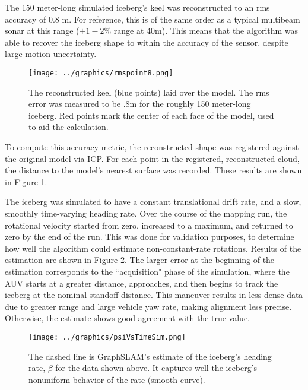 The 150 meter-long simulated iceberg's keel was reconstructed to an rms accuracy of 0.8 m. For reference, this is of the same order as a typical multibeam sonar at this range ($\pm 1-2\%$ range at 40m). This means that the algorithm was able to recover the iceberg shape to within the accuracy of the sensor, despite large motion uncertainty. 

 \begin{figure}[!htb]
   \centering
   \texttt{[image: ../graphics/rmspoint8.png]} %
   \caption{The reconstructed keel (blue points) laid over the model. The rms error was measured to be .8m for the roughly 150 meter-long iceberg. Red points mark the center of each face of the model, used to aid the calculation.}
   \label{fig:RMS}
\end{figure}

To compute this accuracy metric, the reconstructed shape was registered against the original model via ICP. For each point in the registered, reconstructed cloud, the distance to the model's nearest surface was recorded. These results are shown in Figure \ref{fig:RMS}. 

The iceberg was simulated to have a constant translational drift rate, and a slow, smoothly time-varying heading rate. Over the course of the mapping run, the rotational velocity started from zero, increased to a maximum, and returned to zero by the end of the run. This was done for validation purposes, to determine how well the algorithm could estimate non-constant-rate rotations. Results of the estimation are shown in Figure \ref{fig:PsiEst}. The larger error at the beginning of the estimation corresponds to the ``acquisition" phase of the simulation, where the AUV starts at a greater distance, approaches, and then begins to track the iceberg at the nominal standoff distance. This maneuver results in less dense data due to greater range and large vehicle yaw rate, making alignment less precise. Otherwise, the estimate shows good agreement with the true value.

 \begin{figure}[!htb]
   \centering
   \texttt{[image: ../graphics/psiVsTimeSim.png]} %
   \caption{The dashed line is GraphSLAM's estimate of the iceberg's heading rate, $\beta$ for the data shown above. It captures well the iceberg's nonuniform behavior of the rate (smooth curve).}
   \label{fig:PsiEst}
\end{figure}

